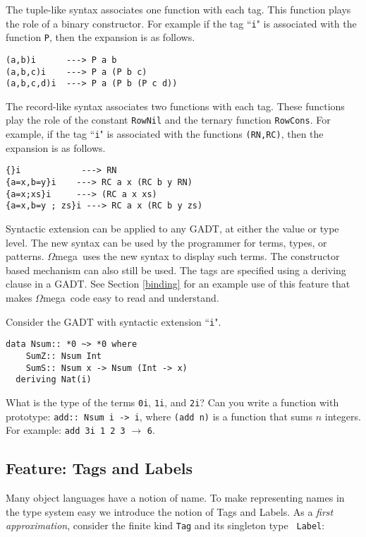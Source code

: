\documentclass[11pt,twoside,A4]{llncs}
\newcommand{\om}{\emph{$\Omega$}mega}
\begin{document}
The tuple-like syntax associates one function with each
tag. This function plays the role of a binary constructor.
For example if the tag ``{\tt i}" is associated with
the function {\tt P}, then the expansion is as follows.

{\small
\begin{verbatim}
(a,b)i      ---> P a b
(a,b,c)i    ---> P a (P b c)
(a,b,c,d)i  ---> P a (P b (P c d))
\end{verbatim}}

The record-like syntax associates two functions with each
tag. These functions play the role of the constant {\tt RowNil} and 
the ternary function {\tt RowCons}.
For example, if the tag ``{\tt i}" is associated with
the functions {\tt (RN,RC)}, then the expansion is as follows.

{\small
\begin{verbatim}
{}i            ---> RN
{a=x,b=y}i    ---> RC a x (RC b y RN)
{a=x;xs}i     ---> (RC a x xs)
{a=x,b=y ; zs}i ---> RC a x (RC b y zs)
\end{verbatim}}

Syntactic extension can be applied to any GADT, at either the value or type level. The
new syntax can be used by the programmer for terms, types, or patterns. \om\ uses the
new syntax to display such terms. The constructor based mechanism can also still
be used. The tags are specified using a deriving clause in a GADT. 
See Section \ref{binding} for an example use of this feature that
makes \om\ code easy to read and understand.

\begin{exercise}
Consider the GADT with syntactic extension ``{\tt i}".
{\small
\begin{verbatim}
data Nsum:: *0 ~> *0 where
    SumZ:: Nsum Int
    SumS:: Nsum x -> Nsum (Int -> x)
  deriving Nat(i)
\end{verbatim}}
\noindent
What is the type of the terms {\tt 0i}, {\tt 1i}, and {\tt 2i}? Can you write
a function with prototype: {\tt add:: Nsum i -> i}, where {\tt (add n)}
is a function that sums
$n$ integers. For example:
\verb+add 3i 1 2 3+ $\longrightarrow$ \verb+6+.
\end{exercise}

\subsection {Feature: Tags and Labels} \label{tag}

Many object languages have a notion of name. To make representing names in the
type system easy we introduce the notion of Tags and Labels. As a {\em first
approximation}, consider the finite kind {\tt Tag} and its singleton type {\tt
Label}:
\end{document}

